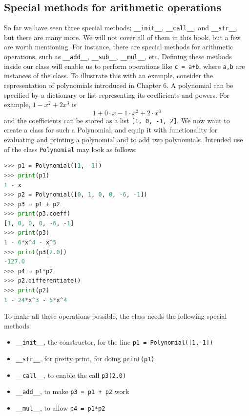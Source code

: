 \documentclass[graybox,envcountchap,sectrefs,final]{svmonodo}
\begin{document}
\subsection{Special methods for arithmetic operations}
So far we have seen three special methods; \Verb!__init__!, \Verb!__call__!, and \Verb!__str__!, but there are many more. We will
not cover all of them in this book, but a few are worth mentioning. For instance, there are special methods for
arithmetic operations, such as \Verb!__add__!, \Verb!__sub__!, \Verb!__mul__!, etc. Defining these methods inside our class
will enable us to perform operations like \texttt{c = a+b}, where \texttt{a,b} are instances of the class. To illustrate this with
an example, consider the representation of polynomials introduced in Chapter 6. A polynomial can be specified
by a dictionary or list representing its coefficients and powers. For example,
$1 - x^2 + 2x^3$ is
\[  1 + 0\cdot x - 1\cdot x^2 + 2\cdot x^3 \]
and the coefficients can be stored as a list \texttt{[1, 0, -1, 2]}. We now want to create a class for such a Polynomial,
and equip it with functionality for evaluating and printing a polynomial and to add two polynomials. Intended use of
the class \texttt{Polynomial} may look as follows:
\begin{lstlisting}[language=Python,style=blue1]
>>> p1 = Polynomial([1, -1])
>>> print(p1)
1 - x
>>> p2 = Polynomial([0, 1, 0, 0, -6, -1])
>>> p3 = p1 + p2
>>> print(p3.coeff)
[1, 0, 0, 0, -6, -1]
>>> print(p3)
1 - 6*x^4 - x^5
>>> print(p3(2.0))
-127.0
>>> p4 = p1*p2
>>> p2.differentiate()
>>> print(p2)
1 - 24*x^3 - 5*x^4
\end{lstlisting}
To make all these operations possible, the class needs the following special methods:
\begin{itemize}
\item \Verb!__init__!, the constructor, for the line \texttt{p1 = Polynomial([1,-1])}

\item \Verb!__str__!, for pretty print, for doing \texttt{print(p1)}

\item \Verb!__call__!, to enable the call \texttt{p3(2.0)}

\item \Verb!__add__!, to make \texttt{p3 = p1 + p2} work

\item \Verb!__mul__!, to allow \texttt{p4 = p1*p2}
\end{itemize}
\end{document}
